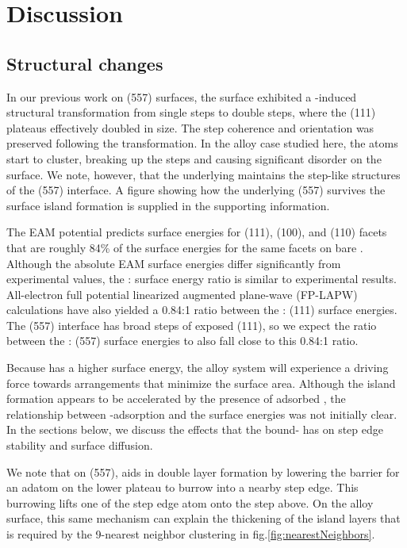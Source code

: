\section{Discussion}

\subsection{Structural changes}

In our previous work on (557) surfaces,\citep{Michalka:2013} the
surface exhibited a -induced structural transformation from
single steps to double steps, where the (111) plateaus effectively
doubled in size. The step coherence and orientation was preserved
following the transformation.  In the alloy case studied here, the
 atoms start to cluster, breaking up the steps and causing
significant disorder on the surface.  We note, however, that the
underlying  maintains the step-like structures of the (557)
interface.  A figure showing how the underlying (557) survives
the surface island formation is supplied in the supporting
information.

The EAM potential predicts surface energies for  (111), (100),
and (110) facets that are roughly 84\% of the surface energies for the
same facets on bare .\citep{EAM} Although the absolute EAM
surface energies differ significantly from experimental values, the
: surface energy ratio is similar to experimental
results.\citep{Tyson:1977xe,De-Boer:1988tg} All-electron full potential
linearized augmented plane-wave (FP-LAPW) calculations have also
yielded a 0.84:1 ratio between the : (111) surface
energies.\citep{Silva:2006fk} The (557) interface has broad steps of
exposed (111), so we expect the ratio between the :
(557) surface energies to also fall close to this 0.84:1 ratio.

Because  has a higher surface energy, the alloy system will
experience a driving force towards arrangements that minimize the
 surface area.  Although the  island formation appears
to be accelerated by the presence of adsorbed , the
relationship between -adsorption and the surface energies was
not initially clear. In the sections below, we discuss the effects
that the bound- has on step edge stability and surface
diffusion.

We note that on (557),  aids in double layer formation
by lowering the barrier for an adatom on the lower plateau to burrow
into a nearby step edge.\citep{Michalka:2013} This burrowing lifts one
of the step edge atom onto the step above.  On the alloy surface, this
same mechanism can explain the thickening of the  island layers
that is required by the 9-nearest neighbor clustering in
fig.\ref{fig:nearestNeighbors}.

